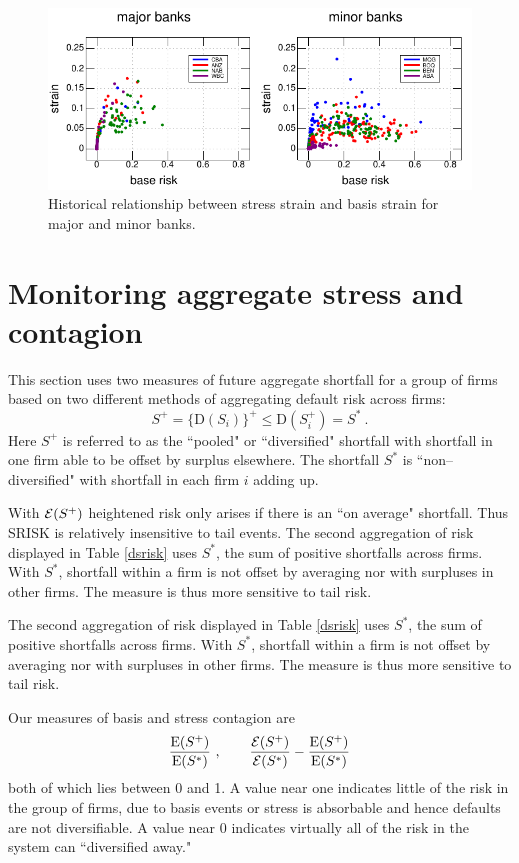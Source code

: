 \documentclass[authoryear]{elsarticle}
\newcommand{\E}{\mathrm{E}}
\newcommand{\Ex}{{\cal E}}
\newcommand{\tref}[1]{Table \ref{#1}}
\newcommand{\cq}{\ , \qquad}
\newcommand{\be}[1]{\begin{equation}\label{#1}}
\newcommand{\ee}{\end{equation}}
\newcommand{\D}{\mathrm{D}}
\begin{document}
\begin{figure}[htbp]
\begin{center}
\includegraphics[width=12cm]{figures/fig5.pdf}
\caption{Historical relationship between stress strain and basis strain    for major   and  minor banks.}
\label{fig5}
\end{center}
\end{figure}


\section{Monitoring aggregate  stress and contagion}\label{aggregate}

This section uses two measures of future aggregate shortfall for a group of firms based on two different methods of aggregating default risk across firms:
$$
S^+ = \{\D(S_i)\}^+\le \D(S_i^+) =S^*\ .
$$
Here $S^+$ is referred to as the ``pooled" or ``diversified" shortfall with shortfall in one firm able to be offset by surplus elsewhere.  The shortfall $S^*$ is ``non--diversified" with shortfall in each firm $i$ adding up.

With $\Ex(S^+)$ heightened risk only arises if there is an ``on average"  shortfall.   Thus SRISK is relatively insensitive to tail events.  The second aggregation of risk displayed in \tref{dsrisk} uses $S^*$, the  sum of positive shortfalls across firms.  With $S^*$, shortfall within a firm is not offset by averaging  nor with surpluses in other firms. The measure is thus more sensitive to tail risk.
  
The second aggregation of risk displayed in \tref{dsrisk} uses $S^*$, the  sum of positive shortfalls across firms.  With $S^*$, shortfall within a firm is not offset by averaging  nor with surpluses in other firms. The measure is thus more sensitive to tail risk.

Our measures of basis and stress contagion are 
\be{cont}
\frac{\E(S^+)}{\E(S^*)}\cq  \frac{\Ex(S^+)}{\Ex(S^*)}- \frac{\E(S^+)}{\E(S^*)}
\ee
 both of which lies between 0 and 1.   A value near one indicates little of the risk in the group of firms, due to basis events or stress is absorbable and hence defaults are not diversifiable.   A value near 0 indicates virtually all of the risk in the system can ``diversified away." 
 
\end{document}
